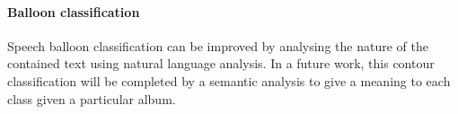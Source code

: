\paragraph{Balloon classification} %
\label{par:balloon_classification}
Speech balloon classification can be improved by analysing the nature of the contained text using natural language analysis.
In a future work, this contour classification will be completed by a semantic analysis to give a meaning to each class given a particular album.

